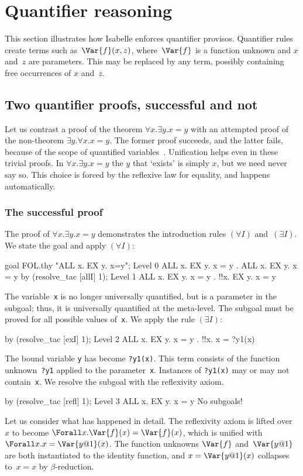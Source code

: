 \section{Quantifier reasoning}
This section illustrates how Isabelle enforces quantifier provisos.
Quantifier rules create terms such as~$\Var{f}(x,z)$, where~$\Var{f}$ is a
function unknown and $x$ and~$z$ are parameters.  This may be replaced by
any term, possibly containing free occurrences of $x$ and~$z$.

\subsection{Two quantifier proofs, successful and not}
Let us contrast a proof of the theorem $\forall x.\exists y.x=y$ with an
attempted proof of the non-theorem $\exists y.\forall x.x=y$.  The former
proof succeeds, and the latter fails, because of the scope of quantified
variables~\cite{paulson89}.  Unification helps even in these trivial
proofs. In $\forall x.\exists y.x=y$ the $y$ that `exists' is simply $x$,
but we need never say so. This choice is forced by the reflexive law for
equality, and happens automatically.

\subsubsection{The successful proof}
The proof of $\forall x.\exists y.x=y$ demonstrates the introduction rules
$(\forall I)$ and~$(\exists I)$.  We state the goal and apply $(\forall I)$:
\begin{ttbox}
goal FOL.thy "ALL x. EX y. x=y";
{\out Level 0}
{\out ALL x. EX y. x = y}
{. ALL x. EX y. x = y}
\ttbreak
by (resolve_tac [allI] 1);
{\out Level 1}
{\out ALL x. EX y. x = y}
{. !!x. EX y. x = y}
\end{ttbox}
The variable~{\tt x} is no longer universally quantified, but is a
parameter in the subgoal; thus, it is universally quantified at the
meta-level.  The subgoal must be proved for all possible values of~{\tt x}.
We apply the rule $(\exists I)$:
\begin{ttbox}
by (resolve_tac [exI] 1);
{\out Level 2}
{\out ALL x. EX y. x = y}
{. !!x. x = ?y1(x)}
\end{ttbox}
The bound variable {\tt y} has become {\tt?y1(x)}.  This term consists of
the function unknown~{\tt?y1} applied to the parameter~{\tt x}.
Instances of {\tt?y1(x)} may or may not contain~{\tt x}.  We resolve the
subgoal with the reflexivity axiom.
\begin{ttbox}
by (resolve_tac [refl] 1);
{\out Level 3}
{\out ALL x. EX y. x = y}
{\out No subgoals!}
\end{ttbox}
Let us consider what has happened in detail.  The reflexivity axiom is
lifted over~$x$ to become $\Forall x.\Var{f}(x)=\Var{f}(x)$, which is
unified with $\Forall x.x=\Var{y@1}(x)$.  The function unknowns $\Var{f}$
and~$\Var{y@1}$ are both instantiated to the identity function, and
$x=\Var{y@1}(x)$ collapses to~$x=x$ by $\beta$-reduction.

